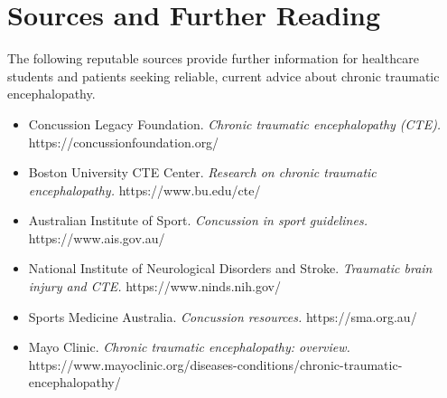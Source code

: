 \section*{Sources and Further Reading}
The following reputable sources provide further information for healthcare students and patients seeking reliable, current advice about chronic traumatic encephalopathy.

\begin{itemize}
    \item Concussion Legacy Foundation. \textit{Chronic traumatic encephalopathy (CTE).} https://concussionfoundation.org/
    \item Boston University CTE Center. \textit{Research on chronic traumatic encephalopathy.} https://www.bu.edu/cte/
    \item Australian Institute of Sport. \textit{Concussion in sport guidelines.} https://www.ais.gov.au/
    \item National Institute of Neurological Disorders and Stroke. \textit{Traumatic brain injury and CTE.} https://www.ninds.nih.gov/
    \item Sports Medicine Australia. \textit{Concussion resources.} https://sma.org.au/
    \item Mayo Clinic. \textit{Chronic traumatic encephalopathy: overview.} https://www.mayoclinic.org/diseases-conditions/chronic-traumatic-encephalopathy/
\end{itemize}
